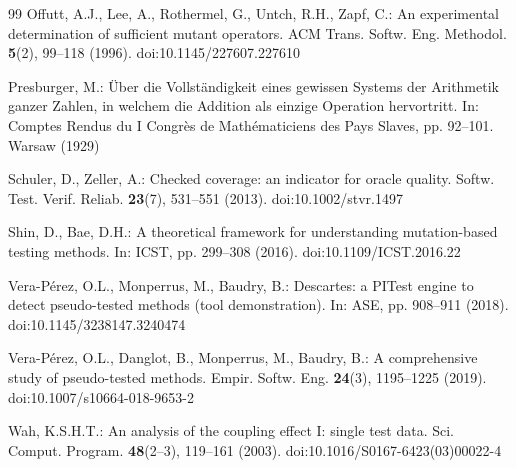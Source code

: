 \documentclass[conference]{IEEEtran}
\theoremstyle{run}
\begin{document}
\begin{thebibliography}{99}
Offutt, A.J., Lee, A., Rothermel, G., Untch, R.H., Zapf, C.: An experimental determination of sufficient mutant operators. ACM Trans. Softw. Eng. Methodol. \textbf{5}(2), 99--118 (1996). doi:10.1145/227607.227610

Presburger, M.: \"{U}ber die Vollst\"{a}ndigkeit eines gewissen Systems der Arithmetik ganzer Zahlen, in welchem die Addition als einzige Operation hervortritt. In: Comptes Rendus du I Congr\`{e}s de Math\'{e}maticiens des Pays Slaves, pp. 92--101. Warsaw (1929)

Schuler, D., Zeller, A.: Checked coverage: an indicator for oracle quality. Softw. Test. Verif. Reliab. \textbf{23}(7), 531--551 (2013). doi:10.1002/stvr.1497

Shin, D., Bae, D.H.: A theoretical framework for understanding mutation-based testing methods. In: ICST, pp. 299--308 (2016). doi:10.1109/ICST.2016.22

Vera-P\'{e}rez, O.L., Monperrus, M., Baudry, B.: Descartes: a PITest engine to detect pseudo-tested methods (tool demonstration). In: ASE, pp. 908--911 (2018). doi:10.1145/3238147.3240474

Vera-P\'{e}rez, O.L., Danglot, B., Monperrus, M., Baudry, B.: A comprehensive study of pseudo-tested methods. Empir. Softw. Eng. \textbf{24}(3), 1195--1225 (2019). doi:10.1007/s10664-018-9653-2

Wah, K.S.H.T.: An analysis of the coupling effect I: single test data. Sci. Comput. Program. \textbf{48}(2--3), 119--161 (2003). doi:10.1016/S0167-6423(03)00022-4

\end{thebibliography}
\end{document}

